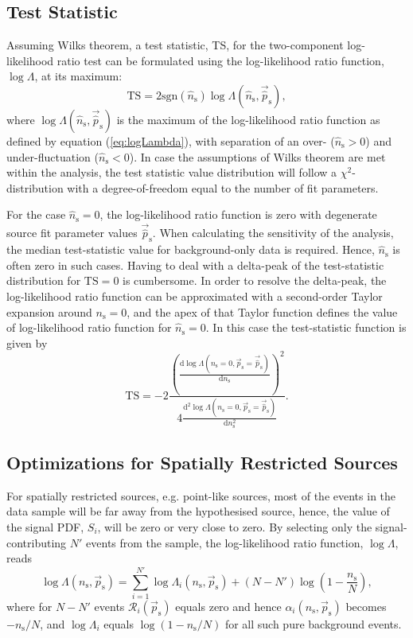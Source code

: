 \documentclass{article}
\newcommand{\ns}{n_{\mathrm{s}}}
\newcommand{\hatns}{\hat{n}_{\mathrm{s}}}
\newcommand{\ps}{\vec{p}_{\mathrm{s}}}
\newcommand{\hatps}{\vec{\hat{p}}_{\mathrm{s}}}
\begin{document}
\subsection{Test Statistic}
\label{sec:teststatistic}

Assuming Wilks theorem, a test statistic, TS, for the two-component log-likelihood
ratio test can be formulated using the log-likelihood ratio function, $\log\Lambda$,
at its maximum:
\begin{equation}
 \mathrm{TS} = 2\mathrm{sgn}(\hatns) \log \Lambda(\hatns, \hatps),
 \label{eq:TS}
\end{equation}
where $\log \Lambda(\hatns,\hatps)$ is the maximum of the
log-likelihood ratio function as defined by equation (\ref{eq:logLambda}),
with separation of an over- ($\hatns > 0$) and under-fluctuation ($\hatns < 0$).
In case the assumptions of Wilks theorem are met within the analysis, the test
statistic value distribution will follow a $\chi^2$-distribution with
a degree-of-freedom equal to the number of fit parameters.

For the case $\hatns=0$, the log-likelihood ratio function is zero
with degenerate source fit parameter values $\hatps$.
When calculating the sensitivity of the analysis, the median test-statistic value
for background-only data is required. Hence, $\hatns$ is often zero in such cases.
Having to deal with a delta-peak of the test-statistic distribution
for $\mathrm{TS}=0$ is cumbersome. In order to resolve the delta-peak, the
log-likelihood ratio function can be approximated with a second-order Taylor
expansion around $\ns=0$, and the apex of that Taylor function defines the value of
log-likelihood ratio function for $\hatns=0$. In this case the test-statistic
function is given by
\begin{equation}
 \mathrm{TS} = -2\frac{\left(\frac{\mathrm{d}\log\Lambda(\ns=0,\ps=\hatps)}{\mathrm{d}\ns}\right)^2}{4\frac{\mathrm{d}^2\log\Lambda(\ns=0,\ps=\hatps)}{\mathrm{d}\ns^2}}.
\end{equation}

\subsection{Optimizations for Spatially Restricted Sources}

For spatially restricted sources, e.g. point-like sources, most of the events in
the data sample will be far away from the hypothesised source, hence, the value of the
signal PDF, $S_i$, will be zero or very close to zero. By selecting only
the signal-contributing $N'$ events from the sample, the log-likelihood ratio
function, $\log \Lambda$, reads
\begin{equation}
 \log \Lambda(\ns,\ps) = \sum_{i=1}^{N'} \log \Lambda_i(\ns,\ps) + (N - N')\log(1 - \frac{\ns}{N}),
 \label{eq:logLambdaOfXOptimized}
\end{equation}
where for $N-N'$ events $\mathcal{R}_i(\ps)$ equals zero and hence
$\alpha_i(\ns,\ps)$ becomes $-\ns/N$, and $\log \Lambda_i$ equals $\log(1 - \ns/N)$
for all such pure background events.
\end{document}
